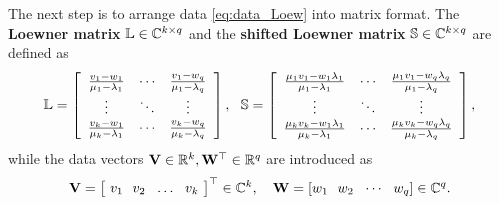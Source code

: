 

The next step is to arrange data \cref{eq:data_Loew} into matrix format. The \textbf{Loewner matrix} ${\mathbb L} \in{\mathbb C}^{k\times q}$ and the \textbf{shifted Loewner matrix} ${{\mathbb S}} \in{\mathbb C}^{k\times q}$ are defined as
\begin{equation} \label{eq:Loew_mat}
\IL=\left[\begin{array}{ccc}
\frac{v_1-w_1}{\mu_1-\lambda_1} & \cdots &
\frac{v_1-w_q}{\mu_1-\lambda_q} \\
\vdots & \ddots & \vdots \\
\frac{v_k-w_1}{\mu_k-\lambda_1} & \cdots &
\frac{v_k-w_q}{\mu_k-\lambda_q} \\
\end{array}\right], \ \ 
\sIL=\left[\begin{array}{ccc}
\frac{\mu_1v_1-w_1\lambda_1}{\mu_1-\lambda_1} & \cdots &
\frac{\mu_1v_1-w_q \lambda_q}{\mu_1-\lambda_q} \\
\vdots & \ddots & \vdots \\
\frac{\mu_kv_k-w_1 \lambda_1}{\mu_k-\lambda_1} & \cdots &
\frac{\mu_kv_k-w_q\lambda_q}{\mu_k-\lambda_q} \\
\end{array}\right],
\end{equation}
while the data vectors ${\mathbf V}\in {\mathbb R}^k, {\mathbf W}^\top \in {\mathbb R}^q$ are introduced as
\begin{equation} \label{eq:VW_vec}
{\mathbf V}=\left[\!\begin{array}{cccc} v_1 \  \ v_2 \  \ \ldots \  \ v_k \end{array}\!\right]^\top \in {\mathbb C}^k, \ \ \ {\mathbf W}=[w_1~~w_2~~\cdots~~w_q] \in {\mathbb C}^q.
\end{equation}

